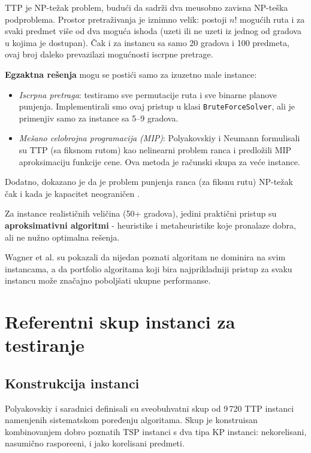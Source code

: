 \documentclass[12pt,a4paper]{article}
\begin{document}
TTP je NP-te\v{z}ak problem, budu\'{c}i da sadr\v{z}i dva me\dj{}usobno zavisna NP-te\v{s}ka podproblema. Prostor pretra\v{z}ivanja je iznimno velik: postoji $n!$ mogu\'{c}ih ruta i za svaki predmet vi\v{s}e od dva mogu\'{c}a ishoda (uzeti ili ne uzeti iz jednog od gradova u kojima je dostupan). Čak i za instancu sa samo 20 gradova i 100 predmeta, ovaj broj daleko prevazilazi mogu\'{c}nosti iscrpne pretrage.

\textbf{Egzaktna re\v{s}enja} mogu se posti\'{c}i samo za izuzetno male instance:
\begin{itemize}
    \item \textit{Iscrpna pretraga}: testiramo sve permutacije ruta i sve binarne planove punjenja. Implementirali smo ovaj pristup u klasi \texttt{BruteForceSolver}, ali je primenjiv samo za instance sa 5--9 gradova.
    \item \textit{Me\v{s}ano celobrojna programacija (MIP)}: Polyakovskiy i Neumann \cite{polyakovskiy2015} formulisali su TTP (sa fiksnom rutom) kao nelinearni problem ranca i predlo\v{z}ili MIP aproksimaciju funkcije cene. Ova metoda je ra\v{c}unski skupa za ve\'{c}e instance. 
   \end{itemize}
 
Dodatno, dokazano je da je problem punjenja ranca (za fiksnu rutu) NP-te\v{z}ak \v{c}ak i kada je kapacitet neograni\v{c}en \cite{polyakovskiy2015}.

Za instance realisti\v{c}nih veli\v{c}ina (50+ gradova), jedini prakti\v{c}ni pristup su \textbf{aproksimativni algoritmi} - heuristike i metaheuristike koje pronalaze dobra, ali ne nu\v{z}no optimalna re\v{s}enja.

Wagner et al. \cite{wagner_selection} su pokazali da nijedan poznati algoritam ne dominira na svim instancama, a da portfolio algoritama koji bira najprikladniji pristup za svaku instancu mo\v{z}e zna\v{c}ajno pobolj\v{s}ati ukupne performanse.

\section{Referentni skup instanci za testiranje}

\subsection{Konstrukcija instanci}

Polyakovskiy i saradnici \cite{polyakovskiy2014} definisali su sveobuhvatni skup od 9\,720 TTP instanci namenjenih sistematskom poređenju algoritama. Skup je konstruisan kombinovanjem dobro poznatih TSP instanci s dva tipa KP instanci: nekorelisani, nasumi\v{c}no raspore\dj{}eni, i jako korelisani predmeti.
\end{document}

